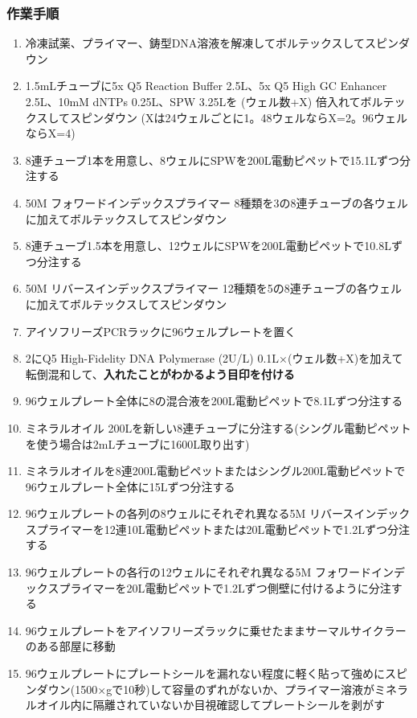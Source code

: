 \documentclass[titlepage,10pt,a4paper,uplatex]{jsbook}
\renewcommand{\textbf}[1]{{\bfseries\sffamily#1}}
\begin{document}
\subsubsection{作業手順}
\begin{enumerate}
\item 冷凍試薬、プライマー、鋳型DNA溶液を解凍してボルテックスしてスピンダウン
\item 1.5mLチューブに5x Q5 Reaction Buffer 2.5{\textmu}L、5x Q5 High GC Enhancer 2.5{\textmu}L、10mM dNTPs 0.25{\textmu}L、SPW 3.25{\textmu}Lを (ウェル数+X) 倍入れてボルテックスしてスピンダウン (Xは24ウェルごとに1。48ウェルならX=2。96ウェルならX=4)
\item 8連チューブ1本を用意し、8ウェルにSPWを200{\textmu}L電動ピペットで15.1{\textmu}Lずつ分注する
\item 50{\textmu}M フォワードインデックスプライマー 8種類を3の8連チューブの各ウェルに加えてボルテックスしてスピンダウン
\item 8連チューブ1.5本を用意し、12ウェルにSPWを200{\textmu}L電動ピペットで10.8{\textmu}Lずつ分注する
\item 50{\textmu}M リバースインデックスプライマー 12種類を5の8連チューブの各ウェルに加えてボルテックスしてスピンダウン
\item アイソフリーズPCRラックに96ウェルプレートを置く
\item 2にQ5 High-Fidelity DNA Polymerase (2U/{\textmu}L) 0.1{\textmu}L×(ウェル数+X)を加えて転倒混和して、\textbf{入れたことがわかるよう目印を付ける}
\item 96ウェルプレート全体に8の混合液を200{\textmu}L電動ピペットで8.1{\textmu}Lずつ分注する
\item ミネラルオイル 200{\textmu}Lを新しい8連チューブに分注する(シングル電動ピペットを使う場合は2mLチューブに1600{\textmu}L取り出す)
\item ミネラルオイルを8連200{\textmu}L電動ピペットまたはシングル200{\textmu}L電動ピペットで96ウェルプレート全体に15{\textmu}Lずつ分注する
\item 96ウェルプレートの各列の8ウェルにそれぞれ異なる5{\textmu}M リバースインデックスプライマーを12連10{\textmu}L電動ピペットまたは20{\textmu}L電動ピペットで1.2{\textmu}Lずつ分注する
\item 96ウェルプレートの各行の12ウェルにそれぞれ異なる5{\textmu}M フォワードインデックスプライマーを20{\textmu}L電動ピペットで1.2{\textmu}Lずつ側壁に付けるように分注する
\item 96ウェルプレートをアイソフリーズラックに乗せたままサーマルサイクラーのある部屋に移動
\item 96ウェルプレートにプレートシールを漏れない程度に軽く貼って強めにスピンダウン(1500×gで10秒)して容量のずれがないか、プライマー溶液がミネラルオイル内に隔離されていないか目視確認してプレートシールを剥がす

\end{enumerate}
\end{document}

